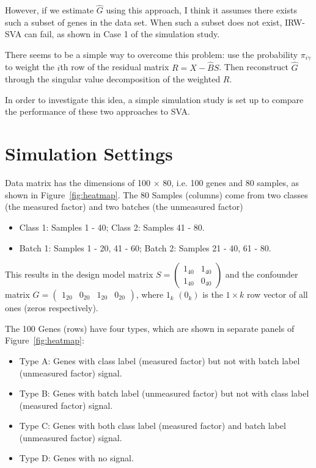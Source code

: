 \documentclass[11pt]{article}
\begin{document}
However, if we estimate $\hat{G}$ using this approach, I think it assumes there exists such a subset of genes in the data set. When such a subset does not exist, IRW-SVA can fail, as shown in Case 1 of the simulation study.

There seems to be a simple way to overcome this problem: use the probability $\pi_{i \gamma}$ to weight the $i$th row of the residual matrix $R = X - \hat{B} S$. Then reconstruct $\hat{G}$ through the singular value decomposition of the weighted $R$. 


In order to investigate this idea, a simple simulation study is set up to compare the performance of these two approaches to SVA.

\section{Simulation Settings} 

Data matrix has the dimensions of 100 $\times$ 80, i.e. 100 genes and 80 samples, as shown in Figure~\ref{fig:heatmap}. The 80 Samples (columns) come from two classes (the measured factor) and two batches (the unmeasured factor)
\begin{itemize} 
\item Class 1: Samples 1 - 40; Class 2: Samples 41 - 80.
\item Batch 1: Samples 1 - 20, 41 - 60; Batch 2: Samples 21 - 40, 61 - 80.
\end{itemize}
This results in the design model matrix $S = \begin{pmatrix}
1_{40} & 1_{40} \\
1_{40} & 0_{40} 
\end{pmatrix}$ and the confounder matrix $G = \begin{pmatrix}
1_{20} & 0_{20} & 1_{20} & 0_{20} 
\end{pmatrix}$, where $1_{k}$ $(0_{k})$ is the $1 \times k$ row vector of all ones (zeros respectively).

The 100 Genes (rows) have four types, which are shown in separate panels of Figure~\ref{fig:heatmap}:
\begin{itemize}
\item Type A: Genes with class label (measured factor) but not with batch label (unmeasured factor) signal.
\item Type B: Genes with batch label (unmeasured factor) but not with class label (measured factor) signal.
\item Type C: Genes with both class label (measured factor) and batch label (unmeasured factor) signal.
\item Type D: Genes with no signal.
\end{itemize}
\end{document}
